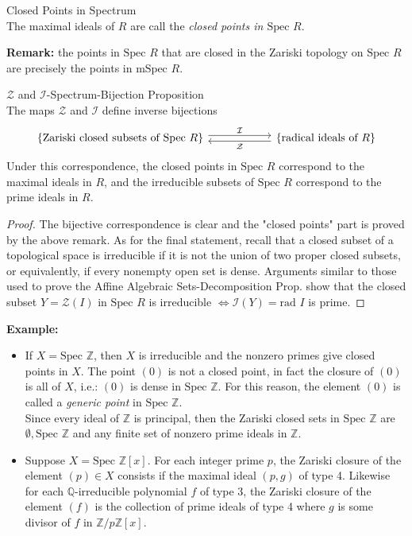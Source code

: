 \begin{definition}{Closed Points in Spectrum}\\
The maximal ideals of $R$ are call the \textit{closed points in $\text{Spec }R$}.
\end{definition}

\noindent\textbf{Remark:} the points in $\text{Spec }R$ that are closed in the Zariski topology on $\text{Spec }R$ are precisely the points in $\text{mSpec }R$.

\begin{proposition}{$\mathcal{Z}$ and $\mathcal{I}$-Spectrum-Bijection Proposition}\\
The maps $\mathcal{Z}$ and $\mathcal{I}$ define inverse bijections
\[
\begin{tikzcd}[column sep=2cm]
    \{ \text{Zariski closed subsets of } \text{Spec }R \} \arrow[r, shift left=0.6ex, "\mathcal{I}"] & \{\text{radical ideals of } R\} \arrow[l, shift left=0.6ex, "\mathcal{Z}"]
\end{tikzcd}
\]
Under this correspondence, the closed points in $\text{Spec }R$ correspond to the maximal ideals in $R$, and the irreducible subsets of $\text{Spec }R$ correspond to the prime ideals in $R$.
\end{proposition}

\begin{proof}
    The bijective correspondence is clear and the "closed points" part is proved by the above remark. As for the final statement, recall that a closed subset of a topological space is irreducible if it is not the union of two proper closed subsets, or equivalently, if every nonempty open set is dense. Arguments similar to those used to prove the Affine Algebraic Sets-Decomposition Prop. show that the closed subset $Y= \mathcal{Z} (I)$ in $\text{Spec }R$ is irreducible $\Leftrightarrow \mathcal{I} (Y) = \text{rad }I$ is prime.
\end{proof}

\noindent\textbf{Example:} \begin{itemize}
    \item If $X=\text{Spec }\mathbb{Z}$, then $X$ is irreducible and the nonzero primes give closed points in $X$. The point $(0)$ is not a closed point, in fact the closure of $(0)$ is all of $X$, i.e.: $(0)$ is dense in $\text{Spec }\mathbb{Z}$. For this reason, the element $(0)$ is called a \textit{generic point} in $\text{Spec }\mathbb{Z}$.\\
    Since every ideal of $\mathbb{Z}$ is principal, then the Zariski closed sets in $\text{Spec } \mathbb{Z}$ are $\emptyset, \text{Spec } \mathbb{Z}$ and any finite set of nonzero prime ideals in $\mathbb{Z}$.


    \item Suppose $X= \text{Spec } \mathbb{Z} [x]$. For each integer prime $p$, the Zariski closure of the element $(p) \in X$ consists if the maximal ideal $(p,g)$ of type 4. Likewise for each $\mathbb{Q}$-irreducible polynomial $f$ of type 3, the Zariski closure of the element $(f)$ is the collection of prime ideals of type 4 where $g$ is some divisor of $f$ in $\mathbb{Z} /p\mathbb{Z} [x]$.
\end{itemize}


